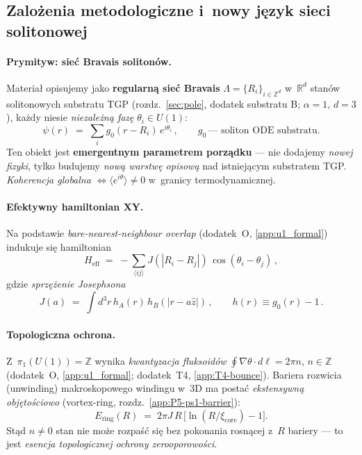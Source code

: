 \subsection{Zalo\.zenia metodologiczne i~nowy j\k{e}zyk sieci solitonowej}%
\label{app:P5-methodology}

\paragraph{Prymityw: sieć Bravais solitonów.}
Materia\l{} opisujemy jako \textbf{regularn\k{a} sie\'c Bravais}
$\Lambda = \{R_i\}_{i\in\mathbb{Z}^d}$ w~$\mathbb{R}^d$ stan\'ow
solitonowych substratu TGP (rozdz.~\ref{sec:pole}, dodatek substratu B;
$\alpha{=}1$, $d{=}3$),
ka\.zdy niesie \emph{niezale\.zn\k{a} faz\k{e}} $\theta_i \in U(1)$:
\begin{equation}
  \psi(r) \;=\; \sum_i g_0(r - R_i)\,e^{i\theta_i}\,,
  \qquad g_0\,\text{--- soliton ODE substratu}.
\end{equation}
Ten obiekt jest \textbf{emergentnym parametrem porz\k{a}dku} ---
nie dodajemy \emph{nowej fizyki}, tylko budujemy \emph{now\k{a} warstw\k{e}
opisow\k{a}} nad istniej\k{a}cym substratem TGP.
\emph{Koherencja globalna} $\Leftrightarrow \langle e^{i\theta}\rangle \neq 0$
w~granicy termodynamicznej.

\paragraph{Efektywny hamiltonian XY.}
Na podstawie \emph{bare-nearest-neighbour overlap} (dodatek~O, \ref{app:u1_formal})
indukuje si\k{e} hamiltonian
\begin{equation}
\label{eq:P5-Heff}
  H_\text{eff}
  \;=\;
  -\sum_{\langle ij\rangle} J(|R_i-R_j|) \,\cos(\theta_i-\theta_j)\,,
\end{equation}
gdzie \emph{sprz\k{e}\.zenie Josephsona}
\begin{equation}
\label{eq:P5-Jdef}
  J(a) \;=\; \int d^3r\, h_A(r)\,h_B(|r-a\hat z|)\,,
  \qquad h(r) \equiv g_0(r) - 1\,.
\end{equation}

\paragraph{Topologiczna ochrona.}
Z~$\pi_1(U(1)) = \mathbb{Z}$ wynika \emph{kwantyzacja fluksoid\'ow}
$\oint \nabla\theta\cdot d\ell = 2\pi n$, $n\in\mathbb{Z}$
(dodatek~O, \ref{app:u1_formal}; dodatek~T4, \ref{app:T4-bounce}).
Bariera rozwicia (unwinding)
makroskopowego windingu w~3D ma posta\'c \emph{ekstensywn\k{a}
objęto\'sciowo} (vortex-ring, rozdz.~\ref{app:P5-ps1-barrier}):
\begin{equation}
\label{eq:P5-Ering}
  E_\text{ring}(R)
  \;=\;
  2\pi J\,R\,\bigl[\ln(R/\xi_\text{core})-1\bigr].
\end{equation}
St\k{a}d $n\neq 0$ stan nie mo\.ze rozpa\'s\'c si\k{e} bez pokonania
rosn\k{a}cej z~$R$ bariery --- to jest \emph{esencja topologicznej
ochrony zerooporowo\'sci}.

